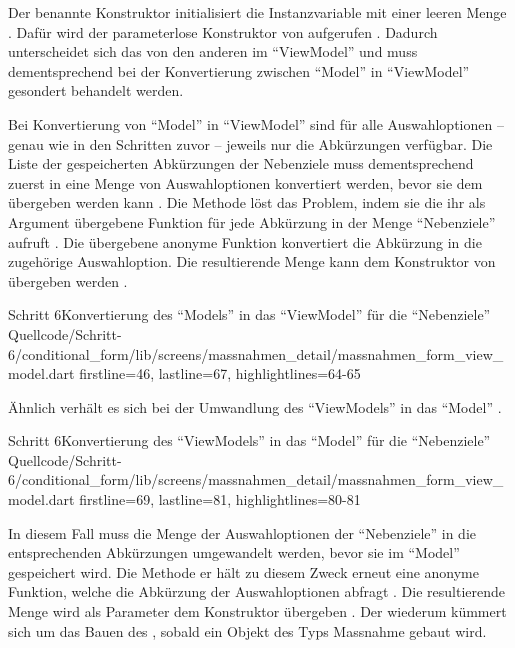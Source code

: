 Der benannte Konstruktor  initialisiert die Instanzvariable mit  einer leeren Menge .
Dafür wird der parameterlose Konstruktor von  aufgerufen .
Dadurch unterscheidet sich das  von den anderen im \enquote{ViewModel}
und muss dementsprechend bei der Konvertierung zwischen \enquote{Model} in \enquote{ViewModel} gesondert behandelt werden.

Bei Konvertierung von \enquote{Model} in \enquote{ViewModel} sind für alle Auswahloptionen -- genau wie in den Schritten zuvor -- jeweils nur die Abkürzungen verfügbar.
Die Liste der gespeicherten Abkürzungen der Nebenziele muss dementsprechend zuerst in eine Menge von Auswahloptionen konvertiert werden,
bevor sie dem  übergeben werden kann \Lst{\ref{lst:Schritt6setModel}}.
Die Methode  löst das Problem,
indem sie die ihr als Argument übergebene Funktion für jede Abkürzung in der Menge \enquote{Nebenziele} aufruft .
Die übergebene anonyme Funktion konvertiert die Abkürzung in die zugehörige Auswahloption.
Die resultierende Menge kann dem Konstruktor von  übergeben werden .

\begin{alexlisting}{Schritt 6}{Konvertierung des \enquote{Models} in das \enquote{ViewModel} für die \enquote{Nebenziele}}
  {Quellcode/Schritt-6/conditional_form/lib/screens/massnahmen_detail/massnahmen_form_view_model.dart}
  {firstline=46, lastline=67, highlightlines={64-65}}
  \label{lst:Schritt6setModel}
\end{alexlisting}


Ähnlich verhält es sich bei der Umwandlung des \enquote{ViewModels} in das \enquote{Model} \Lst{\ref{lst:Schritt6nebenzieleSetBuilder}}.

\begin{alexlisting}{Schritt 6}{Konvertierung des \enquote{ViewModels} in das \enquote{Model} für die \enquote{Nebenziele}}
  {Quellcode/Schritt-6/conditional_form/lib/screens/massnahmen_detail/massnahmen_form_view_model.dart}
  {firstline=69, lastline=81, highlightlines={80-81}}
  \label{lst:Schritt6nebenzieleSetBuilder}
\end{alexlisting}

In diesem Fall muss die Menge der Auswahloptionen der \enquote{Nebenziele} in die entsprechenden Abkürzungen umgewandelt werden,
bevor sie im \enquote{Model} gespeichert wird.
Die Methode  er hält zu diesem Zweck erneut eine anonyme Funktion,
welche die Abkürzung der Auswahloptionen abfragt .
Die resultierende Menge wird als Parameter dem Konstruktor  übergeben .
Der  wiederum kümmert sich um das Bauen des , sobald ein Objekt des Typs Massnahme gebaut wird.



